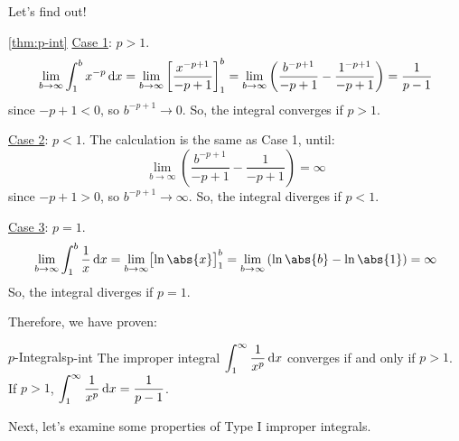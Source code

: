 Let's find out!

\begin{Proof}{\ref{thm:p-int}}{}
    \underline{Case 1}: $ p>1 $.
    \[
        \lim\limits_{{b} \to {\infty}} \int_{1}^{b} x^{-p}\odif{x}
        = \lim\limits_{{b} \to {\infty}} \left[\frac{x^{-p+1}}{-p+1}  \right]_{1}^b
        =\lim\limits_{{b} \to {\infty}} \left( \frac{b^{-p+1}}{-p+1}-
        \frac{1^{-p+1}}{-p+1}  \right)
        =\frac{1}{p-1}
    \]
    since $ -p+1<0 $, so $ b^{-p+1}\to 0 $. So, the integral converges if $ p>1 $.

    \underline{Case 2}: $ p<1 $. The calculation is the same as Case 1, until:
    \[ \lim\limits_{{b} \to {\infty}} \left( \frac{b^{-p+1}}{-p+1} -\frac{1}{-p+1}\right) =\infty  \]
    since $ -p+1>0 $, so $ b^{-p+1}\to\infty $. So, the integral diverges if $ p<1 $.

    \underline{Case 3}: $ p=1 $.
    \[
        \lim\limits_{{b} \to {\infty}} \int_{1}^{b} \frac{1}{x} \odif{x}
        =\lim\limits_{{b} \to {\infty}} \bigl[\ln\abs{x}\bigr]_{1}^b
        =\lim\limits_{{b} \to {\infty}} \left( \ln\abs{b}-\ln\abs{1} \right)
        =\infty
    \]
    So, the integral diverges if $ p=1 $.
\end{Proof}

Therefore, we have proven:

\begin{Theorem}{$p$-Integrals}{p-int}
    The improper integral
    $ \displaystyle \int_{1}^{\infty} \frac{1}{x^p} \odif{x}  $
    converges if and only if $ p>1 $.
    If $ p>1 $,
    $ \displaystyle \int_{1}^{\infty} \frac{1}{x^p} \odif{x} =\frac{1}{p-1} $.
\end{Theorem}

Next, let's examine some properties of Type I improper integrals.

